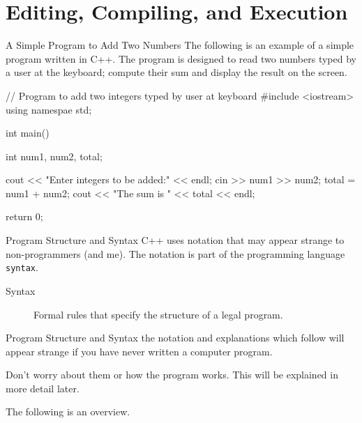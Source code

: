 \documentclass[../lecture1-introduction.tex]{subfiles}
\begin{document}
\section{Editing, Compiling, and Execution}

\begin{frame}[fragile]{A Simple Program to Add Two Numbers}
    The following is an example of a simple program written in C++.
    The program is designed to read two numbers typed by a user at the keyboard;
    compute their sum and display the result on the screen.
\begin{cppcode}
// Program to add two integers typed by user at keyboard
#include <iostream>
using namespae std;

int main()
{
    int num1, num2, total;
    
    cout << "Enter integers to be added:" << endl;
    cin >> num1 >> num2;
    total = num1 + num2;
    cout << "The sum is " << total << endl;
    
    return 0;
}
\end{cppcode}
\end{frame}


\begin{frame}[fragile]{Program Structure and Syntax}
    C++ uses notation that may appear strange to non-programmers (and me).
    The notation is part of the programming language \texttt{syntax}.
    \begin{description}
        \item [Syntax] Formal rules that specify the structure of a legal program.
    \end{description}
\end{frame}

\begin{frame}[fragile]{Program Structure and Syntax}
    the notation and explanations which follow will appear strange if you have
    never written a computer program.

    Don't worry about them or how the program works. This will be explained
    in more detail later.

    The following is an overview.
\end{frame}
\end{document}
